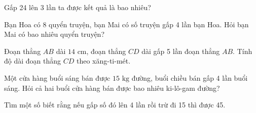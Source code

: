 \begin{ex} %
Gấp 24 lên 3 lần ta được kết quả là bao nhiêu?
\end{ex}

\begin{ex} %
Bạn Hoa có 8 quyển truyện, bạn Mai có số truyện gấp 4 lần bạn Hoa. Hỏi bạn Mai có bao nhiêu quyển truyện?
\end{ex}

\begin{ex} %
Đoạn thẳng $AB$ dài $14\text{ cm}$, đoạn thẳng $CD$ dài gấp 5 lần đoạn thẳng $AB$. Tính độ dài đoạn thẳng $CD$ theo xăng-ti-mét.
\end{ex}

\begin{ex} %
Một cửa hàng buổi sáng bán được $15\text{ kg}$ đường, buổi chiều bán gấp 4 lần buổi sáng. Hỏi cả hai buổi cửa hàng bán được bao nhiêu ki-lô-gam đường?
\end{ex}

\begin{ex} %
Tìm một số biết rằng nếu gấp số đó lên 4 lần rồi trừ đi 15 thì được 45.
\end{ex}
